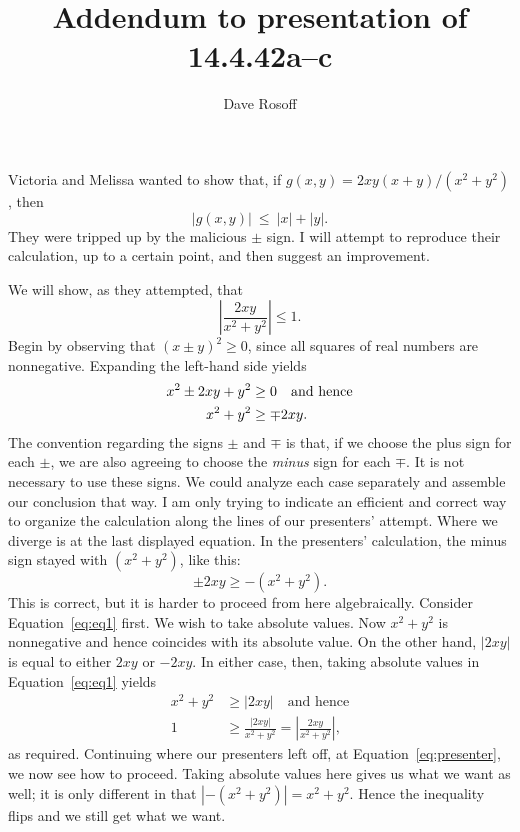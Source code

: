 \documentclass[12pt]{amsart}
\title{Addendum to presentation of 14.4.42a--c}
\author{Dave Rosoff}
\begin{document}
\maketitle

Victoria and Melissa wanted to show that, if $g(x,y) = 2xy(x+y)/(x^2+y^2)$, then 
\[|g(x,y)|~\leq~|x|+|y|.\] They were tripped up by the malicious $\pm$ sign. I will attempt to reproduce their calculation, up to a certain point, and then suggest an improvement.

We will show, as they attempted, that 
\[
    \left| \frac{2xy}{x^2+y^2} \right| \leq 1.
\] 
Begin by observing that $(x \pm y)^2 \geq 0$, since all squares of real numbers are nonnegative. Expanding the left-hand side yields
\begin{align}\label{eq:eq1}
    x^2 \pm 2xy + y^2 &\geq 0 \quad \text{and hence} \notag \\
    x^2 + y^2 &\geq \mp 2xy.
\end{align}
The convention regarding the signs $\pm$ and $\mp$ is that, if we choose the plus sign for each $\pm$, we are also agreeing to choose the \emph{minus} sign for each $\mp$. It is not necessary to use these signs. We could analyze each case separately and assemble our conclusion that way. I am only trying to indicate an efficient and correct way to organize the calculation along the lines of our presenters' attempt. Where we diverge is at the last displayed equation. In the presenters' calculation, the minus sign stayed with $(x^2+y^2)$, like this:
\begin{equation}\label{eq:presenter}
    \pm 2xy \geq -(x^2+y^2). 
\end{equation}
This is correct, but it is harder to proceed from here algebraically. Consider Equation~\ref{eq:eq1} first. We wish to take absolute values. Now $x^2 + y^2$ is nonnegative and hence coincides with its absolute value. On the other hand, $|2xy|$ is equal to either $2xy$ or $-2xy$. In either case, then, taking absolute values in Equation~\ref{eq:eq1} yields
\begin{align*}
    x^2 + y^2 &\geq |2xy| \quad \text{and hence} \\
    1 &\geq \frac{|2xy|}{x^2+y^2} = \left| \frac{2xy}{x^2+y^2} \right|,
\end{align*}
as required. Continuing where our presenters left off, at Equation~\ref{eq:presenter}, we now see how to proceed. Taking absolute values here gives us what we want as well; it is only different in that $|-(x^2+y^2)| = x^2+y^2$. Hence the inequality flips and we still get what we want.
\end{document}
